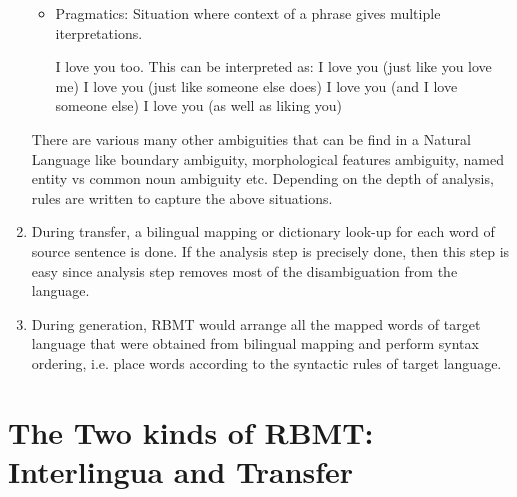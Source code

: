 \begin{enumerate}
\begin{itemize}
            \item Pragmatics: Situation where context of a phrase gives multiple iterpretations.
            \begin{flushleft}
            I love you too.\cite{sep-ambiguity}\linebreak 
            This can be interpreted as:\linebreak 
            I love you (just like you love me)\linebreak 
            I love you (just like someone else does)\linebreak 
            I love you (and I love someone else)\linebreak 
            I love you (as well as liking you)\linebreak 
            \end{flushleft}
        \end{itemize}    
        There are various many other ambiguities that can be find in a Natural Language  like boundary ambiguity, morphological features ambiguity, named entity vs common noun ambiguity etc. Depending on the depth of analysis, rules are written to capture the above situations.
        
        \item During transfer, a bilingual mapping or dictionary look-up for each word of source sentence is done. If the analysis step is precisely done, then this step is easy since analysis step removes most of the disambiguation from the language.
        
        \item During generation, RBMT would arrange all the mapped words of target language that were obtained from bilingual mapping and perform syntax ordering, i.e. place words according to the syntactic rules of target language. 
            
    \end{enumerate}

\section{The Two kinds of RBMT: Interlingua and Transfer} 
